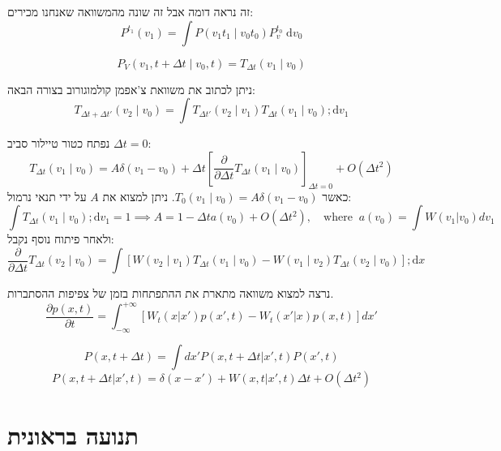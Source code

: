 \documentclass{tstextbook}
\begin{document}
\begin{remark}
זה נראה דומה אבל זה שונה מהמשוואה שאנחנו מכירים:
$$P^{t_{1}}(v_{1})=\int P(v_{1}t_{1}\mid v_{0}t_{0})P_{v}^{t_{0}} \;\mathrm{d}v_{0}$$

\end{remark}
\begin{definition}
$$P_{V}(v_{1},t+\Delta t\mid  v_{0},t)=T_{\Delta t}(v_{1}\mid v_{0})$$

\end{definition}
\begin{corollary}
ניתן לכתוב את משוואת צ'אפמן קולמוגורוב בצורה הבאה:
$$T_{\Delta t+\Delta t'}(v_{2}\mid v_{0})=\int T_{\Delta t'}(v_{2}\mid v_{1})T_{\Delta t}(v_{1}\mid v_{0}) ;\mathrm{d}v_{1}$$

\end{corollary}
נפתח כטור טיילור סביב \(\Delta t = 0\):
$$T_{\Delta t}(v_{1}\mid v_{0})=A\delta(v_{1}-v_{0})+\Delta t\left[ \frac{\partial}{\partial \Delta t} T_{\Delta t}(v_{1}\mid v_{0})\right]_{\Delta t=0} +O(\Delta t^{2})$$
כאשר \(T_{0}(v_{1}\mid v_{0})=A\delta(v_{1}-v_{0})\). ניתן למצוא את \(A\) על ידי תנאי נרמול:
$$\int T_{\Delta t}\left( v_{1}\mid v_{0} \right) ;\mathrm{d}v_{1}=1\implies A=1-\Delta t a (v_{0})+O\left( \Delta t^{2} \right), \quad \text{where}\;\;  a(v_0) = \int W(v_1 | v_0) dv_1$$
ולאחר פיתוח נוסף נקבל:
$$\frac{\partial }{\partial \Delta t} T_{\Delta t}(v_{2}\mid v_{0})=\int [W(v_{2}\mid v_{1})T_{\Delta t}(v_{1}\mid v_{0})-W(v_{1}\mid v_{2})T_{\Delta t}(v_{2}\mid v_{0})] ;\mathrm{d}x$$

נרצה למצוא משוואה מתארת את ההתפתחות בזמן של צפיפות ההסתברות.
$$\frac{\partial p(x, t)}{\partial t} = \int_{-\infty}^{+\infty} [W_t (x|x' )p(x', t) - W_t (x'|x)p(x, t)] dx'$$

$$P(x, t+\Delta t) = \int dx' P(x, t+\Delta t | x', t) P(x', t)$$$$P(x, t+\Delta t | x', t) = \delta(x-x') + W(x, t | x', t)\Delta t + O(\Delta t^2)$$

\section{תנועה בראונית}
\end{document}
